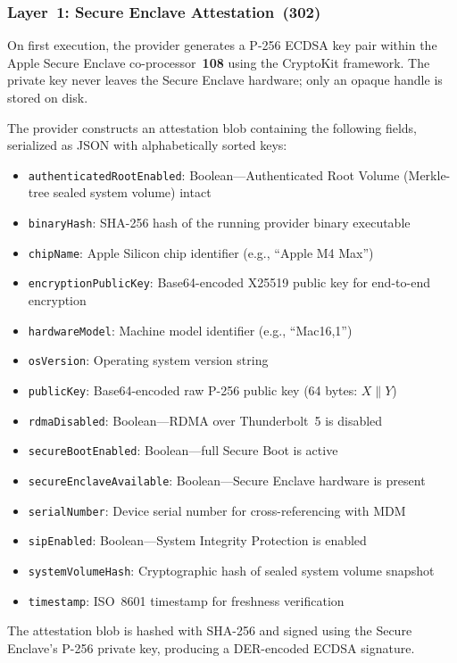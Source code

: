 \documentclass[11pt,letterpaper]{article}
\begin{document}
\subsubsection{Layer~1: Secure Enclave Attestation~(302)}

On first execution, the provider generates a P-256 ECDSA key pair within the Apple Secure Enclave co-processor~\textbf{108} using the CryptoKit framework. The private key never leaves the Secure Enclave hardware; only an opaque handle is stored on disk.

The provider constructs an attestation blob containing the following fields, serialized as JSON with alphabetically sorted keys:

\begin{itemize}[nosep]
\item \texttt{authenticatedRootEnabled}: Boolean---Authenticated Root Volume (Merkle-tree sealed system volume) intact
\item \texttt{binaryHash}: SHA-256 hash of the running provider binary executable
\item \texttt{chipName}: Apple Silicon chip identifier (e.g., ``Apple M4 Max'')
\item \texttt{encryptionPublicKey}: Base64-encoded X25519 public key for end-to-end encryption
\item \texttt{hardwareModel}: Machine model identifier (e.g., ``Mac16,1'')
\item \texttt{osVersion}: Operating system version string
\item \texttt{publicKey}: Base64-encoded raw P-256 public key (64 bytes: $X \| Y$)
\item \texttt{rdmaDisabled}: Boolean---RDMA over Thunderbolt~5 is disabled
\item \texttt{secureBootEnabled}: Boolean---full Secure Boot is active
\item \texttt{secureEnclaveAvailable}: Boolean---Secure Enclave hardware is present
\item \texttt{serialNumber}: Device serial number for cross-referencing with MDM
\item \texttt{sipEnabled}: Boolean---System Integrity Protection is enabled
\item \texttt{systemVolumeHash}: Cryptographic hash of sealed system volume snapshot
\item \texttt{timestamp}: ISO~8601 timestamp for freshness verification
\end{itemize}

The attestation blob is hashed with SHA-256 and signed using the Secure Enclave's P-256 private key, producing a DER-encoded ECDSA signature.
\end{document}
